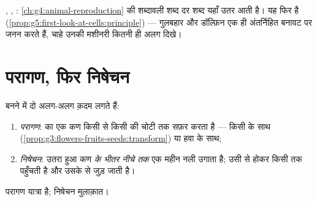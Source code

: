 \begin{remark}[जंतुओं जैसी ही बनावट]\label{rem:g5:flower-to-fruit:sameplan}
 , , : \cref{ch:g4:animal-reproduction} की
शब्दावली शब्द दर शब्द यहाँ उतर आती है। यह फिर  है
(\cref{prop:g5:first-look-at-cells:principle}) --- गुलबहार और
डॉल्फ़िन एक ही अंतर्निहित बनावट पर जनन करते हैं, चाहे उनकी मशीनरी
कितनी ही अलग दिखे।
\end{remark}

\section{परागण, फिर निषेचन}

\begin{definition}[दोनों क़दम]\label{def:g5:flower-to-fruit:steps}
 बनने में दो अलग-अलग क़दम लगते हैं:
\begin{enumerate}
  \item \emph{परागण}:  का एक कण किसी  से
        किसी  की चोटी तक सफ़र करता है --- किसी  के साथ
        (\cref{prop:g3:flowers-fruits-seeds:transform}) या हवा के
        साथ;
  \item \emph{निषेचन}: उतरा हुआ कण
        \emph{ के भीतर नीचे तक} एक महीन नली उगाता है; उसी
        से होकर   किसी  तक पहुँचती है और उसके  से
        जुड़ जाती है।
\end{enumerate}
परागण यात्रा है; निषेचन मुलाक़ात।
\end{definition}

